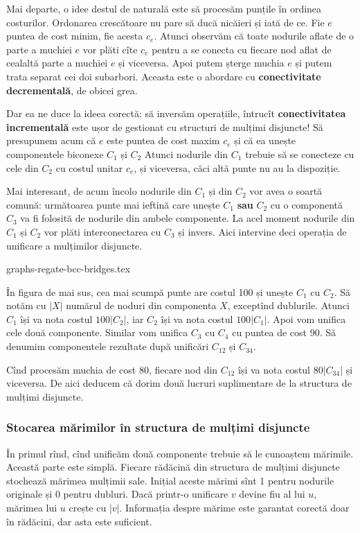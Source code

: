 \documentclass[../main.tex]{subfiles}
\begin{document}
Mai departe, o idee destul de naturală este să procesăm punțile în ordinea costurilor. Ordonarea crescătoare nu pare să ducă nicăieri și iată de ce. Fie $e$ puntea de cost minim, fie acesta $c_e$. Atunci observăm că toate nodurile aflate de o parte a muchiei $e$ vor plăti cîte $c_e$ pentru a se conecta cu fiecare nod aflat de cealaltă parte a muchiei $e$ și viceversa. Apoi putem șterge muchia $e$ și putem trata separat cei doi subarbori. Aceasta este o abordare cu \textbf{conectivitate decrementală}, de obicei grea.

Dar ea ne duce la ideea corectă: să inversăm operațiile, întrucît \textbf{conectivitatea incrementală} este ușor de gestionat cu structuri de mulțimi disjuncte! Să presupunem acum că $e$ este puntea de cost maxim $c_e$ și că ea unește componentele biconexe $C_1$ și $C_2$ Atunci nodurile din $C_1$ trebuie să se conecteze cu cele din $C_2$ cu costul unitar $c_e$, și viceversa, căci altă punte nu au la dispoziție.

Mai interesant, de acum încolo nodurile din $C_1$ și din $C_2$ vor avea o soartă comună: următoarea punte mai ieftină care unește $C_1$ \textbf{sau} $C_2$ cu o componentă $C_3$ va fi folosită de nodurile din ambele componente. La acel moment nodurile din $C_1$ și $C_2$ vor plăti interconectarea cu $C_3$ și invers. Aici intervine deci operația de unificare a mulțimilor disjuncte.

{graphs-regate-bcc-bridges.tex}

În figura de mai sus, cea mai scumpă punte are costul 100 și unește $C_1$ cu $C_2$. Să notăm cu $|X|$ numărul de noduri din componenta $X$, exceptînd dublurile. Atunci $C_1$ își va nota costul $100 |C_2|$, iar $C_2$ își va nota costul $100 |C_1|$. Apoi vom unifica cele două componente. Similar vom unifica $C_3$ cu $C_4$ cu puntea de cost 90. Să denumim componentele rezultate după unificări $C_{12}$ și $C_{34}$.

Cînd procesăm muchia de cost 80, fiecare nod din $C_{12}$ își va nota costul $80 |C_{34}|$ și viceversa. De aici deducem că dorim două lucruri suplimentare de la structura de mulțimi disjuncte.

\subsubsection*{Stocarea mărimilor în structura de mulțimi disjuncte}

În primul rînd, cînd unificăm două componente trebuie să le cunoaștem mărimile. Această parte este simplă. Fiecare rădăcină din structura de mulțimi disjuncte stochează mărimea mulțimii sale. Inițial aceste mărimi sînt 1 pentru nodurile originale și 0 pentru dubluri. Dacă printr-o unificare $v$ devine fiu al lui $u$, mărimea lui $u$ crește cu $|v|$. Informația despre mărime este garantat corectă doar în rădăcini, dar asta este suficient.
\end{document}
